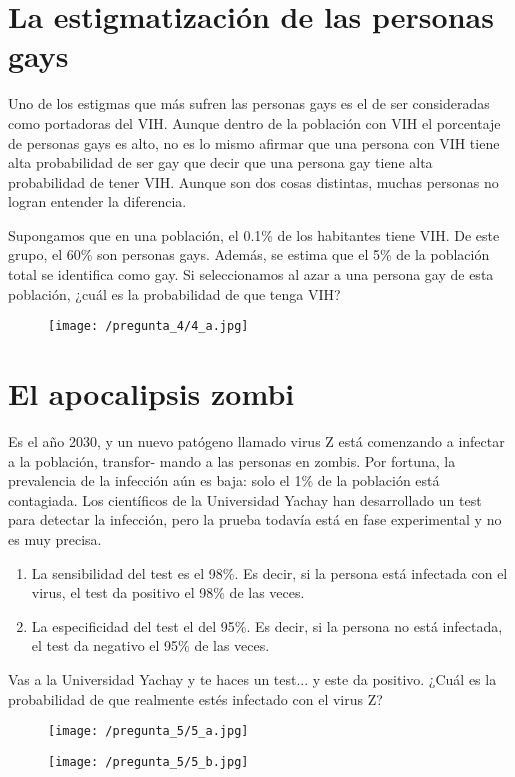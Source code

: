 \documentclass[a4paper]{article}
\begin{document}
\newpage
	
\section*{La estigmatización de las personas gays}

Uno de los estigmas que más sufren las personas gays es el de ser consideradas como portadoras del VIH. Aunque dentro de la población con VIH el porcentaje de personas gays es alto, no es lo mismo afirmar que una persona con VIH tiene alta probabilidad de ser gay que decir que una persona gay tiene alta probabilidad de tener VIH. Aunque son dos cosas distintas, muchas personas no logran entender la diferencia.

Supongamos que en una población, el 0.1\% de los habitantes tiene VIH. De este grupo, el 60\% son personas gays. Además, se estima que el 5\% de la población total se identifica como gay. Si seleccionamos al azar a una persona gay de esta población, ¿cuál es la probabilidad de que tenga VIH?

\begin{figure}[H]
	\texttt{[image: /pregunta\_4/4\_a.jpg]}
\end{figure}


\section*{El  apocalipsis zombi}

Es el año 2030, y un nuevo patógeno llamado virus Z está comenzando a infectar a la población, transfor-
mando a las personas en zombis. Por fortuna, la prevalencia de la infección aún es baja: solo el 1\% de la población está contagiada. Los científicos de la Universidad Yachay han desarrollado un test para detectar la infección, pero la prueba todavía está en fase experimental y no es muy precisa.

\begin{enumerate}[label=•]
	\item La sensibilidad del test es el 98\%. Es decir, si la persona está infectada con el virus, el test da positivo el 98\% de las veces.
	\item La especificidad del test el del 95\%. Es decir, si la persona no está infectada, el test da negativo el 95\% de las veces.
\end{enumerate}

Vas a la Universidad Yachay y te haces un test... y este da positivo. ¿Cuál es la probabilidad de que realmente estés infectado con el virus Z?

\begin{figure}
	\texttt{[image: /pregunta\_5/5\_a.jpg]}

\end{figure}

\begin{figure}
	\texttt{[image: /pregunta\_5/5\_b.jpg]}
\end{figure}
\end{document}
